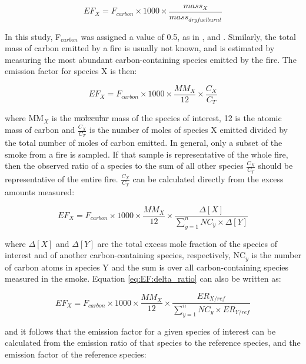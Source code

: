 \documentclass[acp, manuscript]{copernicus}
\providecommand{\DIFadd}[1]{{\protect\color{blue}\uwave{#1}}} %
\providecommand{\DIFdel}[1]{{\protect\color{red}\sout{#1}}}                      %
\providecommand{\DIFaddbegin}{} %
\providecommand{\DIFaddend}{} %
\providecommand{\DIFdelbegin}{} %
\providecommand{\DIFdelend}{} %
\begin{document}
\begin{equation} \label{eq:EF:Fc_mass_ratio}
EF_X = F_{carbon} \times 1000 \times \frac{mass_X}{mass_{dry fuel burnt}}
\end{equation}

In this study, F$_{carbon}$ was assigned a value of 0.5, as in \citet{Akagi2011},\citet{Yokelson2011} and \citet{Paton-Walsh2014}. Similarly, the total mass of carbon emitted by a fire is usually not known, and is estimated by measuring the most abundant carbon-containing species emitted by the fire. The emission factor for species X is then:

\begin{equation} \label{eq:EF:cx_ct}
EF_X = F_{carbon} \times 1000 \times \frac{MM_X}{12} \times \frac{C_X}{C_T}
\end{equation}

where MM$_X$ is the \DIFdelbegin \DIFdel{molecular }\DIFdelend \DIFaddbegin \DIFadd{molar }\DIFaddend mass of the species of interest, 12 is the atomic mass of carbon and $ \frac{C_X}{C_T} $ is the number of moles of species X emitted divided by the total number of moles of carbon emitted. In general, only a subset of the smoke from a fire is sampled. If that sample is representative of the whole fire, then the observed ratio of a species to the sum of all other species  $ \frac{C_X}{C_T} $ should be representative of the entire fire.  $ \frac{C_X}{C_T} $ can be calculated directly from the excess amounts measured:

\begin{equation} \label{eq:EF:delta_ratio}
EF_X = F_{carbon} \times 1000 \times \frac{MM_X}{12} \times \frac{\Delta[X]}{\sum_{y=1}^{n} NC_y \times \Delta[Y]}
\end{equation}

where $\Delta[X]$ and $\Delta[Y]$ are the total excess mole fraction of the species of interest and of another carbon-containing species, respectively, NC$_y$ is the number of carbon atoms in species Y and the sum is over all carbon-containing species measured in the smoke. 
Equation \ref{eq:EF:delta_ratio} can also be written as:

\begin{equation}
EF_X = F_{carbon} \times 1000 \times \frac{MM_X}{12} \times \frac{ER_{X/ref}}{\sum_{y=1}^{n} NC_y \times ER_{Y/ref}}
\end{equation}

and it follows that the emission factor for a given species of interest can be calculated from the emission ratio of that species to the reference species, and the emission factor of the reference species:
\end{document}
